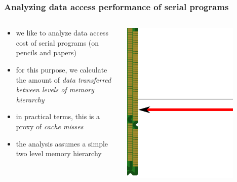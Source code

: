\documentclass[12pt,dvipdfmx]{beamer}
\newcommand{\ao}[1]{{\color{blue}#1}}
\begin{document}
\begin{frame}
\frametitle{Analyzing data access performance of serial programs}
\begin{columns}
\begin{column}{0.6\textwidth}
\begin{itemize}
\item<1-> we like to analyze data access cost of
  serial programs (on pencils and papers)

\item<2-> for this purpose, we calculate the amount of
  \ao{\em data transferred between levels of
    memory hierarchy}

\item<3-> in practical terms, this is a proxy of
  \ao{\em cache misses}

\item<4-> the analysis assumes a simple two level
  memory hierarchy
\end{itemize}
\end{column}

\begin{column}{0.4\textwidth}
\begin{center}
\includegraphics[width=0.8\textwidth]{out/pdf/svg/analysis_motivation.pdf}
\end{center}
\end{column}  
\end{columns}
\end{frame}
\end{document}
